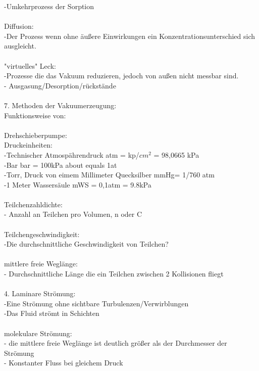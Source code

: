 		-Umkehrprozess der Sorption\\
\\
	   Diffusion:\\
		-Der Prozess wenn ohne äußere Einwirkungen ein Konzentrationsunterschied sich ausgleicht.\\
		\\
	   "virtuelles" Leck:\\
	   	-Prozesse die das Vakuum reduzieren, jedoch von außen nicht messbar sind.\\
		- Ausgasung/Desorption/rückstände\\
\\
	7. Methoden der Vakuumerzeugung:\\
		Funktionsweise von:\\
\\
		Drehschieberpumpe:\\
	   Druckeinheiten:\\
	   	-Technischer Atmospährendruck atm = kp/$cm^2$ = 98,0665 kPa \\
		-Bar bar = 100kPa about equals 1at\\
		-Torr, Druck von eimem Millimeter Quecksilber mmHg= 1/760 atm\\
		-1 Meter Wassersäule mWS = 0,1atm = 9.8kPa\\
\\
	   Teilchenzahldichte:\\
	   	- Anzahl an Teilchen pro Volumen, n oder C\\
\\
	   Teilchengeschwindigkeit:\\
		-Die durchschnittliche Geschwindigkeit von Teilchen?\\
\\
	   mittlere freie Weglänge:\\
	   	- Durchschnittliche Länge die ein Teilchen zwischen 2 Kollisionen fliegt\\
\\
	4. Laminare Strömung:\\
		-Eine Strömung ohne sichtbare Turbulenzen/Verwirblungen\\
		-Das Fluid strömt in Schichten\\
\\
	   molekulare Strömung:\\
		- die mittlere freie Weglänge ist deutlich größer als der Durchmesser der Strömung\\
		- Konstanter Fluss bei gleichem Druck\\
\\
